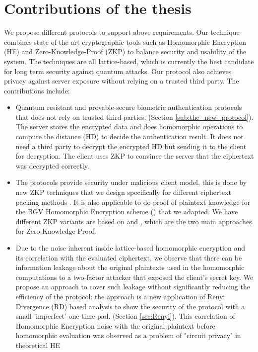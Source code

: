 \section{Contributions of the thesis}
\label{sec:thesisContributions}
We propose different protocols to support above requirements. Our
technique combines state-of-the-art cryptographic tools such as Homomorphic
Encryption (HE) and Zero-Knowledge-Proof (ZKP) to balance security and usability
of the system. The techniques are all lattice-based, which is currently the best
candidate for long term security against quantum attacks. Our protocol also
achieves privacy against server exposure without relying on a trusted third
party. The contributions include:
\begin{itemize}
\item Quantum resistant and provable-secure biometric authentication protocols
  that does not rely on trusted third-parties. (Section
  \ref{sub:the_new_protocol}). The server stores the encrypted data and does
  homomorphic operations to compute the distance (HD) to decide the
  authentication result. It does not need a third party to decrypt the encrypted
  HD but sending it to the client for decryption. The client uses ZKP to
  convince the server that the ciphertext was decrypted correctly.
\item The protocols provide security under malicious client model, this is done
  by new ZKP techniques that we design specifically for different ciphertext
  packing methods . It is also applicable to do proof of plaintext knowledge for
  the BGV Homomorphic Encryption scheme (\cite{brakerski2011fully}) that we
  adapted. We have different ZKP variants are based on \cite{stern1993new} and
  \cite{schnorr1989efficient}, which are the two main approaches for Zero
  Knowledge Proof.
\item Due to the noise inherent inside lattice-based homomorphic encryption and
  its correlation with the evaluated ciphertext, we observe that there can be
  information leakage about the original plaintexts used in the homomorphic
  computations to a two-factor attacker that exposed the client's secret key. We
  propose an approach to cover such leakage without significantly reducing the
  efficiency of the protocol: the approach is a new application of Renyi
  Divergence (RD) based analysis to show the security of the protocol with a
  small 'imperfect' one-time pad. (Section \ref{sec:Renyi}). This correlation of
  Homomorphic Encryption noise with the original plaintext before homomorphic
  evaluation was observed as a problem of "circuit privacy" in theoretical HE

\end{itemize}
